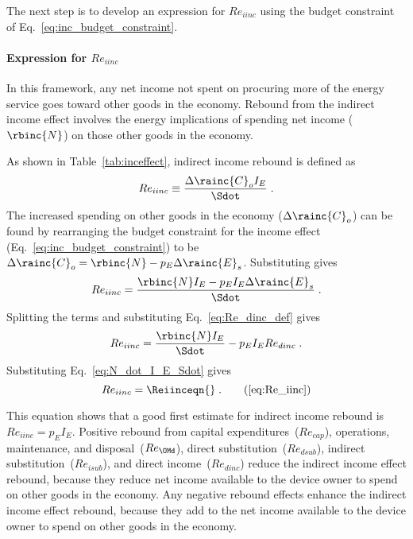 The next step is to develop an expression for $Re_{iinc}$
using the budget constraint of Eq.~\ref{eq:inc_budget_constraint}.

\paragraph{Expression for $Re_{iinc}$}
\label{sec:Re_iinc}

In this framework,
any net income not spent on procuring more of the energy service
goes toward other goods in the economy.
Rebound from the indirect income effect involves 
the energy implications of spending net income ($\rbinc{N}$)
on those other goods in the economy.

As shown in Table~\ref{tab:inceffect}, indirect income rebound is defined as
%
\begin{equation}
  Re_{iinc} \equiv \frac{\Delta \rainc{C}_o I_E}{\Sdot} \; .
\end{equation}
%
The increased spending on other goods in the economy ($\Delta \rainc{C}_o$)
can be found by rearranging the budget constraint for the income effect 
(Eq.~\ref{eq:inc_budget_constraint}) to be 
$\Delta \rainc{C}_o = \rbinc{N} - p_E \Delta \rainc{E}_s$.
Substituting gives
%
\begin{equation}
  Re_{iinc} = \frac{\rbinc{N} I_E - p_E I_E \Delta \rainc{E}_s}{\Sdot} \; .
\end{equation}
%
Splitting the terms and substituting Eq.~\ref{eq:Re_dinc_def} gives
%
\begin{equation}
  Re_{iinc} = \frac{\rbinc{N} I_E}{\Sdot} - p_E I_E Re_{dinc} \; .
\end{equation}
%
Substituting Eq.~\ref{eq:N_dot_I_E_Sdot} gives 
%
\begin{equation}
  Re_{iinc} = \Reiinceqn{} \; . \tag{\ref{eq:Re_iinc}}
\end{equation}

This equation shows that a good first estimate for indirect income rebound
is $Re_{iinc} = p_E I_E$.
Positive rebound from capital expenditures~($Re_{cap}$), 
operations, maintenance, and disposal~($Re_{\OMd}$),
direct substitution~($Re_{dsub}$), 
indirect substitution~($Re_{isub}$), and 
direct income~($Re_{dinc}$)
reduce the indirect income effect rebound, 
because they reduce net income available to the device owner to spend on other goods in the economy.
Any negative rebound effects enhance the indirect income effect rebound, because 
they add to the net income available to the device owner to spend on other goods in the economy.


